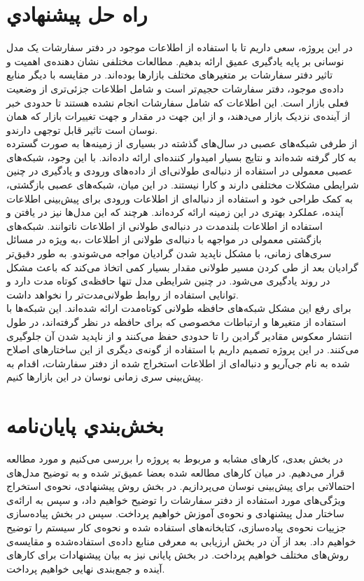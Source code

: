 \section{راه حل پیشنهادي}
در این پروژه، سعی داریم تا با استفاده از اطلاعات موجود در دفتر سفارشات یک مدل نوسانی بر پایه یادگیری عمیق ارائه بدهیم. مطالعات مختلفی نشان دهنده‌ی اهمیت و تاثیر دفتر سفارشات بر متغیر‌های مختلف بازارها بوده‌اند. در مقایسه با دیگر منابع داده‌ی موجود، دفتر سفارشات حجیم‌تر است و شامل اطلاعات جزئی‌تری از وضعیت فعلی بازار است. این اطلاعات که شامل سفارشات انجام نشده هستند تا حدودی خبر از آینده‌ی نزدیک بازار می‌دهند، و از این جهت در مقدار و جهت تغییرات بازار که همان نوسان است تاثیر قابل توجهی دارند\cite{guo2018bitcoin}و\cite{donier2015markets}.\\
از طرفی شبکه‌های عصبی در سال‌های گذشته در بسیاری از زمینه‌ها به صورت گسترده به کار گرفته شده‌اند و نتایج بسیار امیدوار کننده‌ای ارائه داده‌اند. با این وجود، شبکه‌های عصبی معمولی در استفاده از دنباله‌ی طولانی‌ای از داده‌های ورودی و یادگیری در چنین شرایطی مشکلات مختلفی دارند و کارا نیستند\cite{wang2015back}. در این میان، شبکه‌های عصبی بازگشتی، به کمک طراحی خود و استفاده از دنباله‌ای از اطلاعات ورودی برای پیش‌بینی اطلاعات آینده، عملکرد بهتری در این زمینه‌ ارائه کرده‌اند. هرچند که این مدل‌ها نیز در یافتن و استفاده از اطلاعات بلندمدت در دنباله‌ی طولانی از اطلاعات ناتوانند. شبکه‌های بازگشتی معمولی در مواجهه با دنباله‌ی طولانی از اطلاعات ،به ویژه در مسائل سری‌های زمانی، با مشکل ناپدید شدن گرادیان مواجه می‌شوند\cite{hochreiter1998vanishing}و\cite{pascanu2013difficulty}. به طور دقیق‌تر گرادیان بعد از طی کردن مسیر طولانی مقدار بسیار کمی اتخاذ می‌کند که باعث مشکل در روند یادگیری می‌شود. در چنین شرایطی مدل تنها حافظه‌ی کوتاه مدت دارد و توانایی استفاده از روابط طولانی‌مدت‌تر را نخواهد داشت.\\
برای رفع این مشکل شبکه‌های حافظه طولانی کوتاه‌مدت ارائه شده‌اند\cite{hochreiter1997long}. این شبکه‌ها با استفاده از متغیرها و ارتباطات مخصوصی که برای حافظه در نظر گرفته‌اند، در طول انتشار معکوس مقادیر گرادین را تا حدودی حفظ می‌کنند و از ناپدید شدن آن جلوگیری می‌کنند. در این پروژه تصمیم داریم با استفاده از گونه‌ی دیگری از این ساختارهای اصلاح شده به نام جی‌آریو و دنباله‌ای از اطلاعات استخراج شده از دفتر سفارشات، اقدام به پیش‌بینی سری زمانی نوسان در این بازار‌ها کنیم.
\section{بخش‌بندي پایان‌نامه}
در بخش بعدی،‌ کارهای مشابه و مربوط به پروژه‌ را بررسی می‌کنیم و مورد مطالعه قرار می‌دهیم. در میان کارهای مطالعه شده بعضا عمیق‌تر شده و به توضیح مدل‌های احتمالاتی برای پیش‌بینی نوسان می‌پردازیم. در بخش روش پیشنهادی،‌ نحوه‌ی استخراج ویژگی‌های مورد استفاده از دفتر سفارشات را توضیح خواهیم داد، و سپس به ارائه‌ی ساختار مدل پیشنهادی و نحوه‌ی آموزش خواهیم پرداخت. سپس در بخش پیاده‌سازی جزییات نحوه‌ی پیاده‌سازی، کتابخانه‌های استفاده شده و نحوه‌ی کار سیستم را توضیح خواهیم داد. بعد از آن در بخش ارزیابی به معرفی منابع داده‌ی استفاده‌شده و مقایسه‌ی روش‌های مختلف خواهیم پرداخت. در بخش پایانی نیز به بیان پیشنهادات برای کارهای آینده و جمع‌بندی نهایی خواهیم پرداخت.
